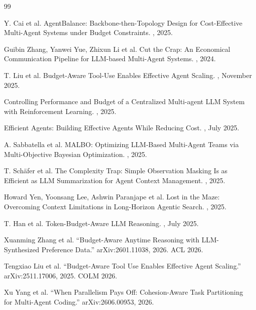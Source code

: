 \begin{thebibliography}{99}

Y. Cai et al.
\newblock AgentBalance: Backbone-then-Topology Design for Cost-Effective Multi-Agent Systems under Budget Constraints.
, 2025.

Guibin Zhang, Yanwei Yue, Zhixun Li et al.
\newblock Cut the Crap: An Economical Communication Pipeline for LLM-based Multi-Agent Systems.
, 2024.

T. Liu et al.
\newblock Budget-Aware Tool-Use Enables Effective Agent Scaling.
, November 2025.

\newblock Controlling Performance and Budget of a Centralized Multi-agent LLM System with Reinforcement Learning.
, 2025.

Efficient Agents: Building Effective Agents While Reducing Cost.
, July 2025.

A. Sabbatella et al.
\newblock MALBO: Optimizing LLM-Based Multi-Agent Teams via Multi-Objective Bayesian Optimization.
, 2025.

T. Sch\"afer et al.
\newblock The Complexity Trap: Simple Observation Masking Is as Efficient as LLM Summarization for Agent Context Management.
, 2025.

Howard Yen, Yoonsang Lee, Ashwin Paranjape et al.
\newblock Lost in the Maze: Overcoming Context Limitations in Long-Horizon Agentic Search.
, 2025.

T. Han et al.
\newblock Token-Budget-Aware LLM Reasoning.
, July 2025.


Xuanming Zhang et al.
``Budget-Aware Anytime Reasoning with LLM-Synthesized Preference Data.''
arXiv:2601.11038, 2026. ACL 2026.

Tengxiao Liu et al.
``Budget-Aware Tool Use Enables Effective Agent Scaling.''
arXiv:2511.17006, 2025. COLM 2026.

Xu Yang et al.
``When Parallelism Pays Off: Cohesion-Aware Task Partitioning for Multi-Agent Coding.''
arXiv:2606.00953, 2026.


\end{thebibliography}
